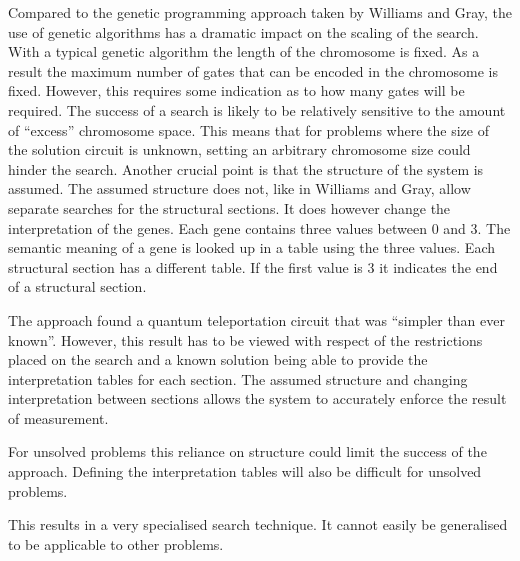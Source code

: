 Compared to the genetic programming approach taken by Williams and Gray, the use of genetic algorithms has a dramatic impact on the scaling of the search.
With a typical genetic algorithm the length of the chromosome is fixed.
As a result the maximum number of gates that can be encoded in the chromosome is fixed.
However, this requires some indication as to how many gates will be required.
The success of a search is likely to be relatively sensitive to the amount of ``excess'' chromosome space.
This means that for problems where the size of the solution circuit is unknown, setting an arbitrary chromosome size could hinder the search.
Another crucial point is that the structure of the system is assumed.
The assumed structure does not, like in Williams and Gray\cite{Williams:1998:ADQ:645812.670824}, allow separate searches for the structural sections.
It does however change the interpretation of the genes.
Each gene contains three values between $0$ and $3$.
The semantic meaning of a gene is looked up in a table using the three values.
Each structural section has a different table.
If the first value is $3$ it indicates the end of a structural section.

The approach found a quantum teleportation circuit that was ``simpler than ever known''\cite{Yabuki00geneticalgorithms}.
However, this result has to be viewed with respect of the restrictions placed on the search and a known solution being able to provide the interpretation tables for each section.
The assumed structure and changing interpretation between sections allows the system to accurately enforce the result of measurement.

For unsolved problems this reliance on structure could limit the success of the approach.
Defining the interpretation tables will also be difficult for unsolved problems.

This results in a very specialised search technique.
It cannot easily be generalised to be applicable to other problems.


